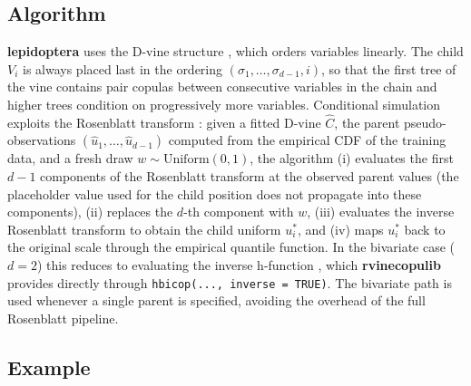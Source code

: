 \documentclass[12pt]{article}
\newcommand{\pkg}[1]{\textbf{#1}}
\newcommand{\code}[1]{\texttt{#1}}
\begin{document}
\subsection{Algorithm}

\pkg{lepidoptera} uses the D-vine structure \citep{dissmann2013selecting}, which
orders variables linearly. The child $V_i$ is always placed last in the ordering
$(\sigma_1, \ldots, \sigma_{d-1}, i)$, so that the first tree of the vine
contains pair copulas between consecutive variables in the chain and higher trees
condition on progressively more variables. Conditional simulation exploits the
Rosenblatt transform \citep{rosenblatt1952remarks}: given a fitted D-vine
$\hat{C}$, the parent pseudo-observations
$(\hat{u}_1, \ldots, \hat{u}_{d-1})$ computed from the empirical CDF of the
training data, and a fresh draw $w \sim \mathrm{Uniform}(0,1)$, the algorithm (i)
evaluates the first $d-1$ components of the Rosenblatt transform at the observed
parent values (the placeholder value used for the child position does not propagate
into these components), (ii) replaces the $d$-th component with $w$, (iii)
evaluates the inverse Rosenblatt transform to obtain the child uniform $u_i^*$, and
(iv) maps $u_i^*$ back to the original scale through the empirical quantile
function. In the bivariate case ($d = 2$) this reduces to evaluating the inverse
h-function \citep{aas2009pair}, which \pkg{rvinecopulib} provides directly through
\code{hbicop(..., inverse = TRUE)}. The bivariate path is used whenever a single
parent is specified, avoiding the overhead of the full Rosenblatt pipeline.

\subsection{Example}

\end{document}
